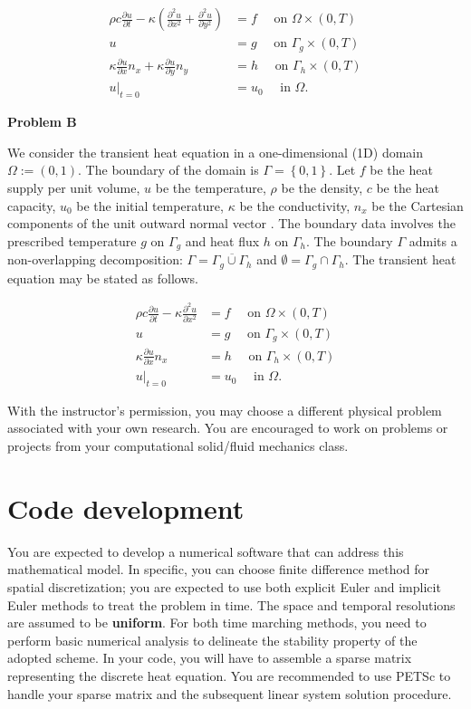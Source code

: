\documentclass[12pt]{article}
\begin{document}
\begin{align*}
\rho c \frac{\partial u}{\partial t} - \kappa \left( \frac{\partial^2 u}{\partial x^2} + \frac{\partial^2 u}{\partial y^2} \right) &= f \quad \mbox{ on } \Omega \times (0,T) \\
u &= g \quad \mbox{ on } \Gamma_{g} \times (0,T) \\
\kappa \frac{\partial u}{\partial x} n_{x} + \kappa \frac{\partial u}{\partial y} n_{y} &= h \quad \mbox{ on } \Gamma_h \times (0,T) \\
u|_{t=0} &= u_0 \quad \mbox{ in } \Omega.
\end{align*}


\textbf{Problem B}

We consider the transient heat equation in a one-dimensional (1D) domain $\Omega := (0,1)$. The boundary of the domain is $\Gamma = \left\lbrace 0, 1 \right\rbrace$.
Let $f$ be the heat supply per unit volume, $u$ be the temperature,  $\rho$ be the density, $c$ be the heat capacity, $u_0$ be the initial temperature, $\kappa$ be the conductivity, $n_x$ be the Cartesian components of the unit outward normal vector . The boundary data involves the prescribed temperature $g$ on $\Gamma_g$ and heat flux $h$ on $\Gamma_h$. The boundary $\Gamma$ admits a non-overlapping decomposition: $\Gamma = \overline{\Gamma_{g} \cup \Gamma_h}$ and $\emptyset = \Gamma_g \cap \Gamma_h$. The transient heat equation may be stated as follows.

\begin{align*}
\rho c \frac{\partial u}{\partial t} - \kappa  \frac{\partial^2 u}{\partial x^2} &= f \quad \mbox{ on } \Omega \times (0,T) \\
u &= g \quad \mbox{ on } \Gamma_{g} \times (0,T) \\
\kappa \frac{\partial u}{\partial x} n_{x}  &= h \quad \mbox{ on } \Gamma_h \times (0,T) \\
u|_{t=0} &= u_0 \quad \mbox{ in } \Omega.
\end{align*}

With the instructor's permission, you may choose a different physical problem associated with your own research. You are encouraged to work on problems or projects from your computational solid/fluid mechanics class.


\section{Code development}
You are expected to develop a numerical software that can address this mathematical model. In specific, you can choose finite difference method for spatial discretization; you are expected to use both explicit Euler and implicit Euler methods to treat the problem in time. The space and temporal resolutions are assumed to be \textbf{uniform}. For both time marching methods, you need to perform basic numerical analysis to delineate the stability property of the adopted scheme. In your code, you will have to assemble a sparse matrix representing the discrete heat equation. You are recommended to use PETSc to handle your sparse matrix and the subsequent linear system solution procedure. 
\end{document}
